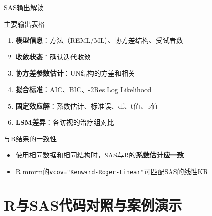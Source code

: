 \documentclass[aspectratio=169,11pt]{beamer}
\begin{document}
\begin{frame}{SAS输出解读}
\begin{block}{主要输出表格}
\begin{enumerate}
    \item \textbf{模型信息}：方法（REML/ML）、协方差结构、受试者数
    \item \textbf{收敛状态}：确认迭代收敛
    \item \textbf{协方差参数估计}：UN结构的方差和相关
    \item \textbf{拟合标准}：AIC、BIC、-2Res Log Likelihood
    \item \textbf{固定效应解}：系数估计、标准误、df、t值、p值
    \item \textbf{LSM差异}：各访视的治疗组对比
\end{enumerate}
\end{block}

\vspace{0.2cm}
\begin{alertblock}{与R结果的一致性}
\begin{itemize}
    \item 使用相同数据和相同结构时，SAS与R的\textbf{系数估计应一致}
    \item R mmrm的\texttt{vcov="Kenward-Roger-Linear"}可匹配SAS的线性KR
\end{itemize}
\end{alertblock}
\end{frame}

\section{R与SAS代码对照与案例演示}
\end{document}
